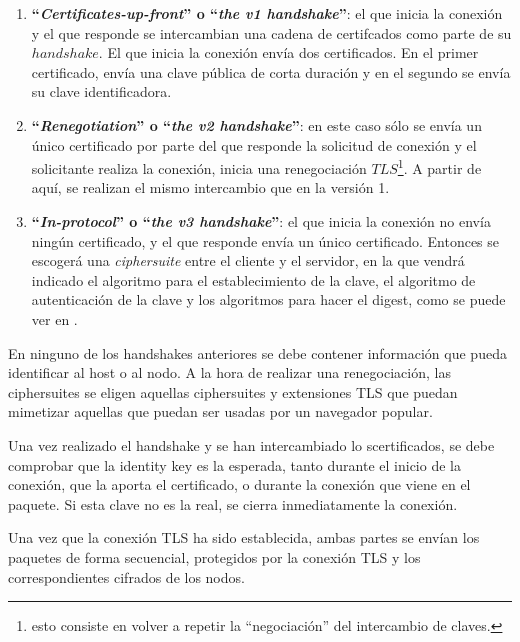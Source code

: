 \documentclass[10pt,a4paper,spanish]{article}
\begin{document}
\begin{enumerate}
    \item \textbf{``\textit{Certificates-up-front}'' o ``\textit{the v1 handshake}''}: el que inicia la conexión y el que responde se intercambian una cadena de certifcados como parte de su $handshake$. El que inicia la conexión envía dos certificados. En el primer certificado, envía una clave pública de corta duración y en el segundo se envía su clave identificadora.

    \item \textbf{``\textit{Renegotiation}'' o ``\textit{the v2 handshake}''}: en este caso sólo se envía un único certificado por parte del que responde la solicitud de conexión y el solicitante realiza la conexión, inicia una renegociación $TLS$\footnote{esto consiste en volver a repetir la ``negociación'' del intercambio de claves.}. A partir de aquí, se realizan el mismo intercambio que en la versión 1.

    \item \textbf{``\textit{In-protocol}'' o ``\textit{the v3 handshake}''}: el que inicia la conexión no envía ningún certificado, y el que responde envía un único certificado. Entonces se escogerá una \textit{ciphersuite} entre el cliente y el servidor, en la que vendrá indicado el algoritmo para el establecimiento de la clave, el algoritmo de autenticación de la clave y los algoritmos para hacer el digest, como se puede ver en \cite{ciphersuite}.
\end{enumerate}

En ninguno de los handshakes anteriores se debe contener información que pueda identificar al host o al nodo. A la hora de realizar una renegociación, las ciphersuites se eligen aquellas ciphersuites y extensiones TLS que puedan mimetizar aquellas que puedan ser usadas por un navegador popular.

Una vez realizado el handshake y se han intercambiado lo scertificados, se debe comprobar que la identity key es la esperada, tanto durante el inicio de la conexión, que la aporta el certificado, o durante la conexión que viene en el paquete. Si esta clave no es la real, se cierra inmediatamente la conexión.

Una vez que la conexión TLS ha sido establecida, ambas partes se envían los paquetes de forma secuencial, protegidos por la conexión TLS y los correspondientes cifrados de los nodos.
\end{document}

